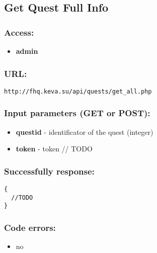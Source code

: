 \subsection{Get Quest Full Info}
\par

\subsubsection{Access:}
\begin{itemize}
  \item \textbf{admin}
\end{itemize}

\subsubsection{URL:}
\begin{Verbatim}[frame=single]
http://fhq.keva.su/api/quests/get_all.php
\end{Verbatim}

\subsubsection{Input parameters (GET or POST):}
\begin{itemize}
  \item \textbf{questid} - identificator of the quest (integer)
  \item \textbf{token} - token // TODO
\end{itemize}

\subsubsection{Successfully response:}
\begin{Verbatim}[frame=single]
{
  //TODO
}
\end{Verbatim}

\subsubsection{Code errors:}
\begin{itemize}
	\item no
\end{itemize}

